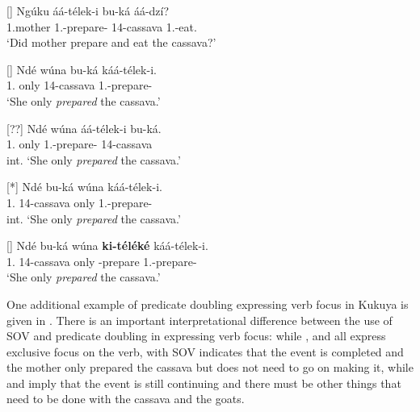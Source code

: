 \documentclass[output=paper,colorlinks,citecolor=brown,
]{langscibook}
\begin{document}
\begin{exe}
    \ex \label{56}
    \begin{xlist}
\ex
[]{
\label{56a}
\gll
Ngúku áá-télek-i bu-ká áá-dzí?\\
1.mother 1\Sm{}.\Pst{}-prepare-\Pst{} 14-cassava 1\Sm{}.\Pst{}-eat.\Pst{}\\
\trans ‘Did mother prepare and eat the cassava?’
}

\ex
[]{
\label{56b}
\gll
Ndé wúna bu-ká káá-télek-i.\\
1.\Pro{} only 14-cassava 1\Sm{}.\Pst{}-prepare-\Pst{}\\
\trans ‘She only \textit{prepared} the cassava.’
}

\ex
[??]{
\label{56c}
\gll
Ndé wúna áá-télek-i bu-ká.\\
1.\Pro{} only 1\Sm{}.\Pst{}-prepare-\Pst{} 14-cassava\\
\trans int. ‘She only \textit{prepared} the cassava.’
}

\ex
[*]{
\label{56d}
\gll
Ndé bu-ká wúna káá-télek-i.\\
1.\Pro{} 14-cassava only 1\Sm{}.\Pst{}-prepare-\Pst{}\\
\trans int. ‘She only \textit{prepared} the cassava.’
}

\ex
[]{
\label{56e}
\gll
Ndé bu-ká wúna \textbf{ki-téléké} káá-télek-i.\\
1.\Pro{} 14-cassava only \Inf{}-prepare 1\Sm{}.\Pst{}-prepare-\Pst{}\\
\trans ‘She only \textit{prepared} the cassava.’
}

    \end{xlist}
\end{exe}
One additional example of predicate doubling expressing verb focus in Kukuya is given in . There is an important interpretational difference between the use of SOV and predicate doubling in expressing verb focus: while ,  and  all express exclusive focus on the verb,  with SOV indicates that the event is completed and the mother only prepared the cassava but does not need to go on making it, while  and  imply that the event is still continuing and there must be other things that need to be done with the cassava and the goats.
\end{document}
